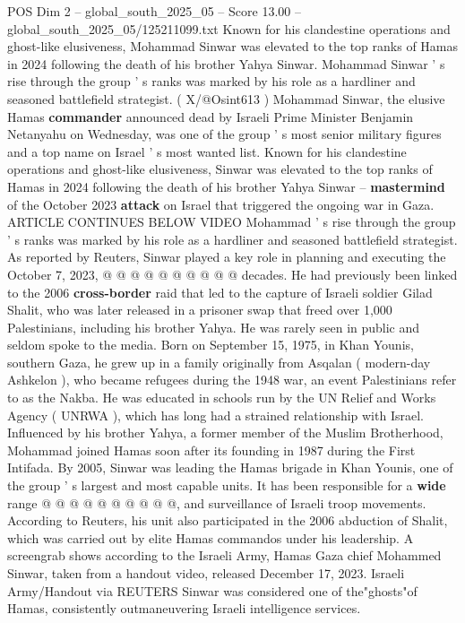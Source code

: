 \begin{textsample}{POS Dim 2 – global\_south\_2025\_05 – Score 13.00 – global\_south\_2025\_05/125211099.txt}  \label{ex:f2_pos_299}
Known for his clandestine operations and ghost-like elusiveness, Mohammad Sinwar was elevated to the top ranks of Hamas in 2024 following the death of his brother Yahya Sinwar.
Mohammad Sinwar ' s rise through the group ' s ranks was marked by his role as a hardliner and seasoned battlefield strategist. ( X/@Osint613 ) Mohammad Sinwar, the elusive Hamas \textbf{commander} announced dead by Israeli Prime Minister Benjamin Netanyahu on Wednesday, was one of the group ' s most senior military figures and a top name on Israel ' s most wanted list.
Known for his clandestine operations and ghost-like elusiveness, Sinwar was elevated to the top ranks of Hamas in 2024 following the death of his brother Yahya Sinwar -- \textbf{mastermind} of the October 2023 \textbf{attack} on Israel that triggered the ongoing war in Gaza.
ARTICLE CONTINUES BELOW VIDEO Mohammad ' s rise through the group ' s ranks was marked by his role as a hardliner and seasoned battlefield strategist.
As reported by Reuters, Sinwar played a key role in planning and executing the October 7, 2023, @ @ @ @ @ @ @ @ @ @ decades.
He had previously been linked to the 2006 \textbf{cross-border} raid that led to the capture of Israeli soldier Gilad Shalit, who was later released in a prisoner swap that freed over 1,000 Palestinians, including his brother Yahya.
He was rarely seen in public and seldom spoke to the media.
Born on September 15, 1975, in Khan Younis, southern Gaza, he grew up in a family originally from Asqalan ( modern-day Ashkelon ), who became refugees during the 1948 war, an event Palestinians refer to as the Nakba.
He was educated in schools run by the UN Relief and Works Agency ( UNRWA ), which has long had a strained relationship with Israel.
Influenced by his brother Yahya, a former member of the Muslim Brotherhood, Mohammad joined Hamas soon after its founding in 1987 during the First Intifada.
By 2005, Sinwar was leading the Hamas brigade in Khan Younis, one of the group ' s largest and most capable units.
It has been responsible for a \textbf{wide} range @ @ @ @ @ @ @ @ @ @, and surveillance of Israeli troop movements.
According to Reuters, his unit also participated in the 2006 abduction of Shalit, which was carried out by elite Hamas commandos under his leadership.
A screengrab shows according to the Israeli Army, Hamas Gaza chief Mohammed Sinwar, taken from a handout video, released December 17, 2023.
Israeli Army/Handout via REUTERS Sinwar was considered one of the"ghosts"of Hamas, consistently outmaneuvering Israeli intelligence services.

\end{textsample}
